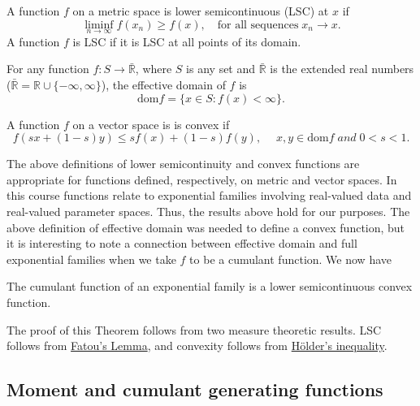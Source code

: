 \documentclass[
]{article}
\begin{document}
\begin{defn}
A function $f$ on a metric space is lower semicontinuous (LSC) at $x$ if 
$$
  \liminf_{n\to\infty} f(x_n) \geq f(x), \quad \text{for all sequences} \; x_n \to x.
$$
A function $f$ is LSC if it is LSC at all points of its domain.
\end{defn}

\begin{defn}
For any function $f:S\to\bar{\mathbb{R}}$, where $S$ is any set and $\bar{\mathbb{R}}$ is the extended real numbers ($\bar{\mathbb{R}} = \mathbb{R}\cup \{-\infty,\infty\}$), the effective domain of $f$ is 
$$
  \text{dom} f = \{x \in S : f(x) < \infty\}.
$$
\end{defn}

\begin{defn}
A function $f$ on a vector space is is convex if 
$$
  f(sx + (1-s)y) \leq sf(x) + (1-s)f(y), \quad \; x,y \in \text{dom} f \; and \; 0 < s < 1.
$$
\end{defn}

The above definitions of lower semicontinuity and convex functions are
appropriate for functions defined, respectively, on metric and vector
spaces. In this course functions relate to exponential families
involving real-valued data and real-valued parameter spaces. Thus, the
results above hold for our purposes. The above definition of effective
domain was needed to define a convex function, but it is interesting to
note a connection between effective domain and full exponential families
when we take \(f\) to be a cumulant function. We now have

\begin{thm} \label{thm-cumulant}
The cumulant function of an exponential family is a lower semicontinuous convex function.
\end{thm}

The proof of this Theorem follows from two measure theoretic results.
LSC follows from
\href{https://en.wikipedia.org/wiki/Fatou\%27s_lemma}{Fatou's Lemma},
and convexity follows from
\href{https://en.wikipedia.org/wiki/H\%C3\%B6lder\%27s_inequality}{Hölder's
inequality}.

\hypertarget{moment-and-cumulant-generating-functions}{%
\subsection{Moment and cumulant generating
functions}\label{moment-and-cumulant-generating-functions}}
\end{document}
